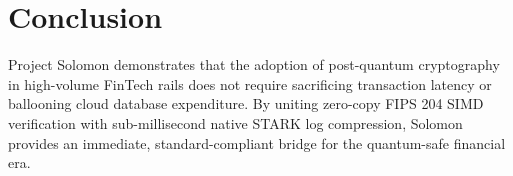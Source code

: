 \documentclass[runningheads]{llncs}
\begin{document}
\section{Conclusion}
Project Solomon demonstrates that the adoption of post-quantum cryptography in high-volume FinTech rails does not require sacrificing transaction latency or ballooning cloud database expenditure. By uniting zero-copy FIPS 204 SIMD verification with sub-millisecond native STARK log compression, Solomon provides an immediate, standard-compliant bridge for the quantum-safe financial era.



\end{document}
